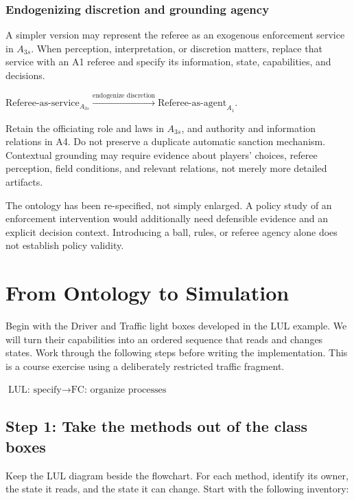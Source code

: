 \documentclass[11pt,a4paper]{article}
\newenvironment{fitdisplay}{\par\medskip\noindent\begin{lrbox}{\displaybox}$\displaystyle}{%
$\end{lrbox}\makebox[\linewidth][c]{\ifdim\wd\displaybox>\linewidth\resizebox{\linewidth}{!}{\usebox{\displaybox}}\else\usebox{\displaybox}\fi}\par\medskip}
\begin{document}
\subsubsection{Endogenizing discretion and grounding agency}
A simpler version may represent the referee as an exogenous enforcement service in $A_{3s}$. When perception, interpretation, or discretion matters, replace that service with an A1 referee and specify its information, state, capabilities, and decisions.
\begin{fitdisplay}
\text{Referee-as-service}_{A_{3s}}
\xrightarrow{\text{endogenize discretion}}
\text{Referee-as-agent}_{A_1}.
\end{fitdisplay}
Retain the officiating role and laws in $A_{3s}$, and authority and information relations in A4. Do not preserve a duplicate automatic sanction mechanism. Contextual grounding may require evidence about players' choices, referee perception, field conditions, and relevant relations, not merely more detailed artifacts.

The ontology has been re-specified, not simply enlarged. A policy study of an enforcement intervention would additionally need defensible evidence and an explicit decision context. Introducing a ball, rules, or referee agency alone does not establish policy validity.

\clearpage
\section{From Ontology to Simulation}

Begin with the Driver and Traffic light boxes developed in the LUL example. We will turn their capabilities into an ordered sequence that reads and changes states. Work through the following steps before writing the implementation. This is a course exercise using a deliberately restricted traffic fragment.

\begin{fitdisplay}
\boxed{\text{LUL: specify}\rightarrow\text{FC: organize processes}}
\end{fitdisplay}

\subsection{Step 1: Take the methods out of the class boxes}

Keep the LUL diagram beside the flowchart. For each method, identify its owner, the state it reads, and the state it can change. Start with the following inventory:
\end{document}
